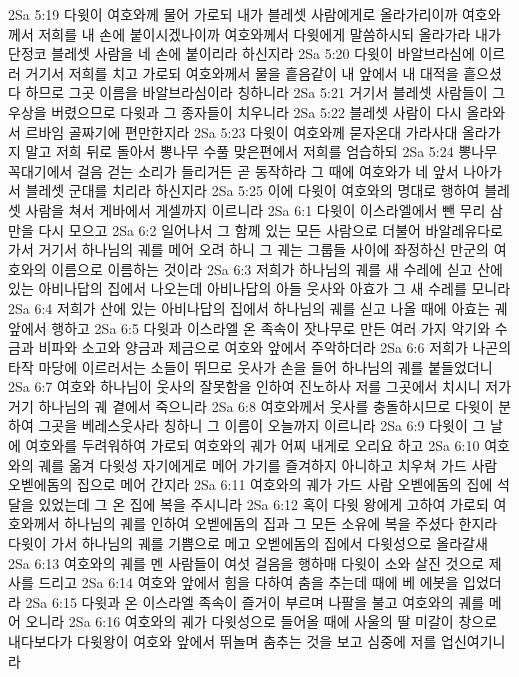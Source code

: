 2Sa 5:19  다윗이 여호와께 물어 가로되 내가 블레셋 사람에게로 올라가리이까 여호와께서 저희를 내 손에 붙이시겠나이까 여호와께서 다윗에게 말씀하시되 올라가라 내가 단정코 블레셋 사람을 네 손에 붙이리라 하신지라
2Sa 5:20  다윗이 바알브라심에 이르러 거기서 저희를 치고 가로되 여호와께서 물을 흩음같이 내 앞에서 내 대적을 흩으셨다 하므로 그곳 이름을 바알브라심이라 칭하니라
2Sa 5:21  거기서 블레셋 사람들이 그 우상을 버렸으므로 다윗과 그 종자들이 치우니라
2Sa 5:22  블레셋 사람이 다시 올라와서 르바임 골짜기에 편만한지라
2Sa 5:23  다윗이 여호와께 묻자온대 가라사대 올라가지 말고 저희 뒤로 돌아서 뽕나무 수풀 맞은편에서 저희를 엄습하되
2Sa 5:24  뽕나무 꼭대기에서 걸음 걷는 소리가 들리거든 곧 동작하라 그 때에 여호와가 네 앞서 나아가서 블레셋 군대를 치리라 하신지라
2Sa 5:25  이에 다윗이 여호와의 명대로 행하여 블레셋 사람을 쳐서 게바에서 게셀까지 이르니라
2Sa 6:1  다윗이 이스라엘에서 뺀 무리 삼만을 다시 모으고
2Sa 6:2  일어나서 그 함께 있는 모든 사람으로 더불어 바알레유다로 가서 거기서 하나님의 궤를 메어 오려 하니 그 궤는 그룹들 사이에 좌정하신 만군의 여호와의 이름으로 이름하는 것이라
2Sa 6:3  저희가 하나님의 궤를 새 수레에 싣고 산에 있는 아비나답의 집에서 나오는데 아비나답의 아들 웃사와 아효가 그 새 수레를 모니라
2Sa 6:4  저희가 산에 있는 아비나답의 집에서 하나님의 궤를 싣고 나올 때에 아효는 궤 앞에서 행하고
2Sa 6:5  다윗과 이스라엘 온 족속이 잣나무로 만든 여러 가지 악기와 수금과 비파와 소고와 양금과 제금으로 여호와 앞에서 주악하더라
2Sa 6:6  저희가 나곤의 타작 마당에 이르러서는 소들이 뛰므로 웃사가 손을 들어 하나님의 궤를 붙들었더니
2Sa 6:7  여호와 하나님이 웃사의 잘못함을 인하여 진노하사 저를 그곳에서 치시니 저가 거기 하나님의 궤 곁에서 죽으니라
2Sa 6:8  여호와께서 웃사를 충돌하시므로 다윗이 분하여 그곳을 베레스웃사라 칭하니 그 이름이 오늘까지 이르니라
2Sa 6:9  다윗이 그 날에 여호와를 두려워하여 가로되 여호와의 궤가 어찌 내게로 오리요 하고
2Sa 6:10  여호와의 궤를 옮겨 다윗성 자기에게로 메어 가기를 즐겨하지 아니하고 치우쳐 가드 사람 오벧에돔의 집으로 메어 간지라
2Sa 6:11  여호와의 궤가 가드 사람 오벧에돔의 집에 석달을 있었는데 그 온 집에 복을 주시니라
2Sa 6:12  혹이 다윗 왕에게 고하여 가로되 여호와께서 하나님의 궤를 인하여 오벧에돔의 집과 그 모든 소유에 복을 주셨다 한지라 다윗이 가서 하나님의 궤를 기쁨으로 메고 오벧에돔의 집에서 다윗성으로 올라갈새
2Sa 6:13  여호와의 궤를 멘 사람들이 여섯 걸음을 행하매 다윗이 소와 살진 것으로 제사를 드리고
2Sa 6:14  여호와 앞에서 힘을 다하여 춤을 추는데 때에 베 에봇을 입었더라
2Sa 6:15  다윗과 온 이스라엘 족속이 즐거이 부르며 나팔을 불고 여호와의 궤를 메어 오니라
2Sa 6:16  여호와의 궤가 다윗성으로 들어올 때에 사울의 딸 미갈이 창으로 내다보다가 다윗왕이 여호와 앞에서 뛰놀며 춤추는 것을 보고 심중에 저를 업신여기니라
